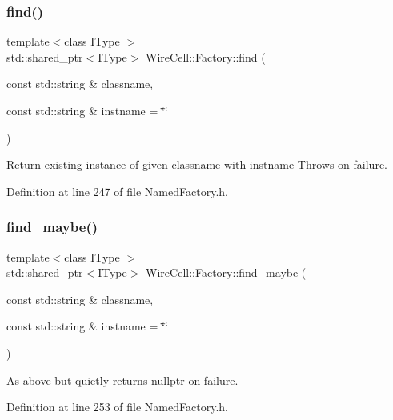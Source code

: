 \subsubsection{\texorpdfstring{find()}{find()}}
{\footnotesize\ttfamily template$<$class I\+Type $>$ \\
std\+::shared\+\_\+ptr$<$I\+Type$>$ Wire\+Cell\+::\+Factory\+::find (\begin{DoxyParamCaption}\item[{const std\+::string \&}]{classname,  }\item[{const std\+::string \&}]{instname = {\ttfamily \char`\"{}\char`\"{}} }\end{DoxyParamCaption})}

Return existing instance of given classname with instname Throws on failure. 

Definition at line 247 of file Named\+Factory.\+h.

\mbox{\label{namespace_wire_cell_1_1_factory_adf719a75b0700dc095df9b9d27c32ede}} 
\subsubsection{\texorpdfstring{find\+\_\+maybe()}{find\_maybe()}}
{\footnotesize\ttfamily template$<$class I\+Type $>$ \\
std\+::shared\+\_\+ptr$<$I\+Type$>$ Wire\+Cell\+::\+Factory\+::find\+\_\+maybe (\begin{DoxyParamCaption}\item[{const std\+::string \&}]{classname,  }\item[{const std\+::string \&}]{instname = {\ttfamily \char`\"{}\char`\"{}} }\end{DoxyParamCaption})}



As above but quietly returns nullptr on failure. 



Definition at line 253 of file Named\+Factory.\+h.

\mbox{\label{namespace_wire_cell_1_1_factory_a3ddc9d93fb9d5c5b32eeef3e996e52bd}} 
